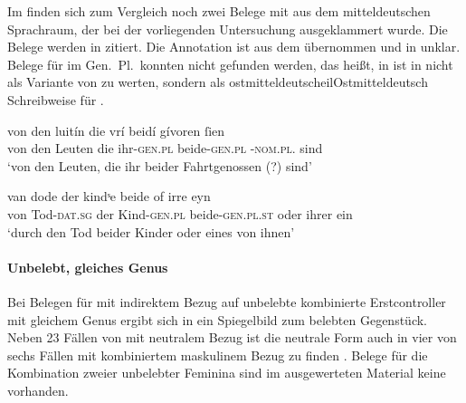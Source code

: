 Im \REM{} finden sich zum Vergleich noch zwei Belege mit  aus dem
mitteldeutschen Sprachraum, der bei der vorliegenden
Untersuchung ausgeklammert wurde. Die Belege werden in 
zitiert. Die Annotation ist aus dem \REM{} übernommen und in
 unklar. Belege für  im Gen.\ Pl.\ konnten
nicht gefunden werden, das heißt,  in  ist in
 nicht als Variante von  zu werten, sondern als
ostmitteldeutscheil{Ostmitteldeutsch} Schreibweise für 
\autocites[52--53]{paul2007}[305]{ksw2}.

\begin{exe}
\ex \label{ex:remgenbeide}
\begin{xlist}
	\ex \label{ex:remgenbeide_1}
		\gll von den luitín die vrí beidí gívoren ſien \\
			von den Leuten die ihr-\textsc{gen.pl} beide-\textsc{gen.pl}
			-\textsc{nom.pl.\MascA} sind
			\\
		\trans `von den Leuten, die ihr beider Fahrtgenossen (?) sind'
			\parencites(; Nordhausen, Stadtarchiv,
				Ms. II, Na 6%
				)[M320: 17v,21--22]{rem}

	\ex \label{ex:remgenbeide_2}
		\gll van dode der kindˢe beide of irre eyn \\
			von Tod-\textsc{dat.sg} der Kind-\textsc{gen.pl} beide-\textsc{gen.pl.st} oder
			ihrer ein \\
		\trans `durch den Tod beider Kinder oder eines von ihnen'
			\parencites(Köln, Historisches Archiv der Stadt, Best.~210 \mkbibparens{Domstift}, U~3/759)[M350: 5,11]{rem}
\end{xlist}
\end{exe}

\paragraph{Unbelebt, gleiches Genus}

Bei Belegen für  mit indirektem Bezug auf unbelebte kombinierte
Erstcontroller mit gleichem Genus ergibt sich in  ein
Spiegelbild zum belebten Gegenstück. Neben 23 Fällen von  mit
neutralem Bezug ist die neutrale Form auch in vier von sechs Fällen mit
kombiniertem maskulinem Bezug zu finden .
Belege für die Kombination zweier unbelebter Feminina sind im ausgewerteten
Material keine vorhanden.

